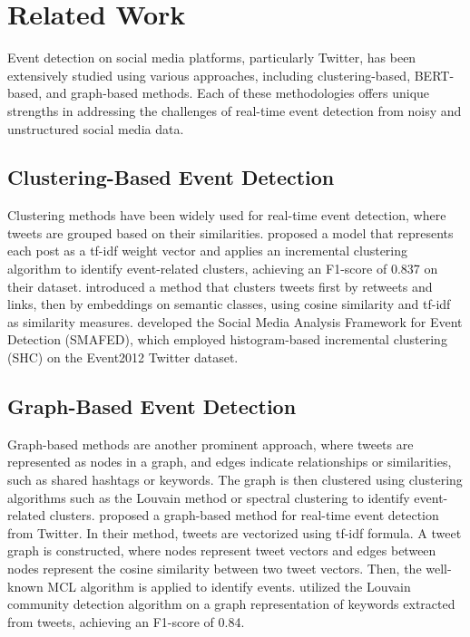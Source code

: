 \section{Related Work}
Event detection on social media platforms, particularly Twitter, has been extensively studied using various approaches, including clustering-based, BERT-based, and graph-based methods. Each of these methodologies offers unique strengths in addressing the challenges of real-time event detection from noisy and unstructured social media data.

\subsection{Clustering-Based Event Detection}
\label{sec:clusteringbased}
Clustering methods have been widely used for real-time event detection, where tweets are grouped based on their similarities. \citet{becker2011beyond} proposed a model that represents each post as a tf-idf weight vector and applies an incremental clustering algorithm to identify event-related clusters, achieving an F1-score of 0.837 on their dataset. \citet{li2017real} introduced a method that clusters tweets first by retweets and links, then by embeddings on semantic classes, using cosine similarity and tf-idf as similarity measures. \citet{kolajo2022real} developed the Social Media Analysis Framework for Event Detection (SMAFED), which employed histogram-based incremental clustering (SHC) on the Event2012 Twitter dataset. 

\subsection{Graph-Based Event Detection}
\label{sec:graphbased}
Graph-based methods are another prominent approach, where tweets are represented as nodes in a graph, and edges indicate relationships or similarities, such as shared hashtags or keywords. The graph is then clustered using clustering algorithms such as the Louvain method or spectral clustering to identify event-related clusters. \citet{graphclus} proposed a graph-based method for real-time event detection from Twitter. In their method, tweets are vectorized using tf-idf formula. A tweet graph is constructed, where nodes represent tweet vectors and edges between nodes represent the cosine similarity between two tweet vectors. Then, the well-known MCL algorithm is applied to identify events. \citet{singh2024event} utilized the Louvain community detection algorithm on a graph representation of keywords extracted from tweets, achieving an F1-score of 0.84.

